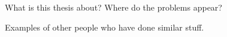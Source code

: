 What is this thesis about?
Where do the problems appear?

Examples of other people who have done similar stuff.

